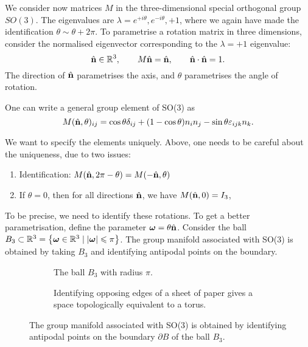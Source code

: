 \begin{example}[G = SO(3)]
  We consider now matrices $M$ in the three-dimensional special orthogonal group $SO(3)$. The eigenvalues are $\lambda = e^{+i \theta}, e^{-i\theta}, +1$, where we again have made the identification $\theta \sim \theta + 2\pi$.
  To parametrise a rotation matrix in three dimensions, consider the normalised eigenvector corresponding to the  $\lambda = +1$ eigenvalue:
  \begin{equation}
    \hat{\vb{n}} \in \mathbb{R}^3, \qquad M \hat{\vb{n}} = \hat{\vb{n}}, \qquad \hat{\vb{n}} \cdot \hat{\vb{n}} = 1.
  \end{equation}
  The direction of $\hat{\vb{n}}$ parametrises the axis, and $\theta$ parametrises the angle of rotation.

  \begin{exercise}
    One can write a general group element of SO(3) as
    \begin{equation}
      M(\hat{\vb{n}}, \theta)_{ij} = \cos\theta \delta_{ij} + (1 - \cos\theta) n_i n_j - \sin\theta \varepsilon_{ijk} n_k.
    \end{equation}
  \end{exercise}

  We want to specify the elements uniquely. Above, one needs to be careful about the uniqueness, due to two issues:
  \begin{enumerate}
    \item Identification: $M(\hat{\vb{n}}, 2\pi - \theta) = M(-\hat{\vb{n}}, \theta)$
    \item If $\theta = 0$, then for all directions $\hat{\vb{n}}$, we have $M(\hat{\vb{n}}, 0) = I_3$,
  \end{enumerate}

  To be precise, we need to identify these rotations. To get a better parametrisation, define the parameter $\boldsymbol\omega = \theta \hat{\vb{n}}$.
  Consider the ball $B_3 \subset \mathbb{R}^3 = \left\{ \boldsymbol\omega \in \mathbb{R}^3 \mid \abs{\boldsymbol\omega} \leqslant \pi \right\}$.
  The group manifold associated with SO(3) is obtained by taking $B_3$ and identifying antipodal points on the boundary.

  \begin{figure}[tbph]
    \centering
    \begin{subfigure}[t]{0.5\linewidth}
      \centering
      \def\svgwidth{0.5\columnwidth}
      
      \caption{The ball $B_3$ with radius $\pi$.}
      \label{fig:ball}
    \end{subfigure}%
    \begin{subfigure}[t]{0.5\linewidth}
      \centering
      \def\svgwidth{\columnwidth}
      
      \caption{Identifying opposing edges of a sheet of paper gives a space topologically equivalent to a torus.}
      \label{fig:identification}
    \end{subfigure}
    \caption{The group manifold associated with SO(3) is obtained by identifying antipodal points on the boundary $\partial B$ of the ball $B_3$.}
  \end{figure}


\end{example}
